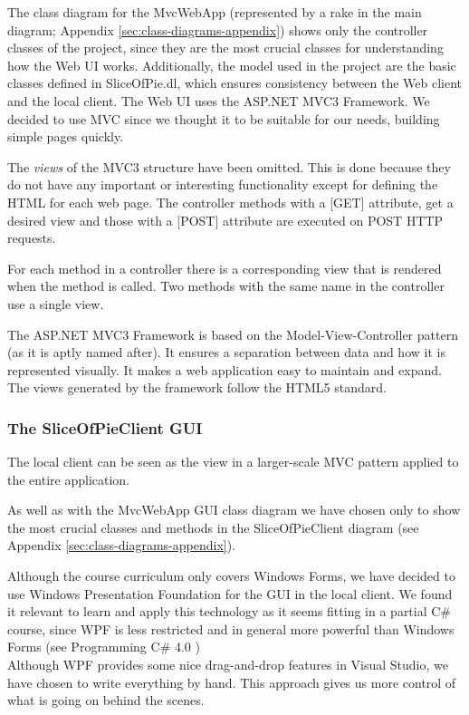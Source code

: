 The class diagram for the MvcWebApp (represented by a rake in the main diagram; Appendix \ref{sec:class-diagrams-appendix}) shows only the controller
classes of the project, since they are the most crucial classes for understanding how the Web UI works. Additionally, the model used in the project
are the basic classes defined in SliceOfPie.dl, which ensures consistency between the Web client and the local client. The Web UI uses the ASP.NET MVC3 Framework. We decided to use MVC since we thought it to be suitable
for our needs, building simple pages quickly.

The \emph{views} of the MVC3 structure have been omitted. This is done because they do not have any important or interesting functionality except for
defining the HTML for each web page. The controller methods with a [GET] attribute, get a desired view and those with a [POST] attribute are executed on
POST HTTP requests.

For each method in a controller there is a corresponding view that is rendered when the method is called. Two methods with the same 
name in the controller use a single view.

The ASP.NET MVC3 Framework is based on the Model-View-Controller pattern (as it is aptly named after). It ensures a separation between data and how
it is represented visually. It makes a web application easy to maintain and expand. The views generated by the framework follow the HTML5 standard.

\subsubsection{The SliceOfPieClient GUI}

The local client can be seen as the view in a larger-scale MVC pattern applied to the entire application.

As well as with the MvcWebApp GUI class diagram we have chosen only to show the most crucial classes and methods in the SliceOfPieClient diagram (see Appendix \ref{sec:class-diagrams-appendix}).

Although the course curriculum only covers Windows Forms, we have decided to use Windows Presentation Foundation for the GUI in the local client. We found it relevant to learn and apply this technology as it seems fitting in a partial C\# course, since WPF is less restricted and in general more powerful than Windows Forms (see Programming C\# 4.0  \cite[p.795-796]{Griffiths2010}) \\
Although WPF provides some nice drag-and-drop features in Visual Studio, we have chosen to write everything by hand. This approach gives us more control of what is going on behind the scenes.

